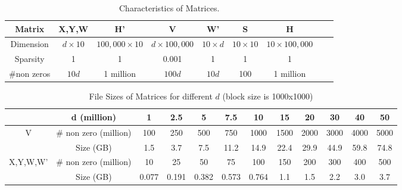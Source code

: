 
\begin{table*}[t]
\centering
\caption{Characteristics of Matrices.}
\label{tab:matrix-stats}
\begin{tabular}{|c|c|c|c|c|c|c|c|c|}
\hline
Matrix & X,Y,W & H' & V & W' & S & H\\
\hline
Dimension & $d\times 10$ &  $100,000\times 10$ & $d\times 100,000$ & $10\times d$ & $10\times 10$ & $10\times 100,000$\\
\hline
Sparsity & 1 & 1& 0.001 & 1 & 1 & 1\\
\hline
\#non zeros & $10d$ & 1 million & $100d$ & $10d$ & 100 & 1 million\\
\hline
\end{tabular}
\SmallCrunch
\end{table*}

\begin{table*}[t]
\centering
\caption{File Sizes of Matrices for different $d$ (block size is 1000x1000)}
\label{tab:file-size}
\begin{tabular}{|c|c|c|c|c|c|c|c|c|c|c|c|}
\hline
& d (million) & 1 & 2.5 & 5 & 7.5 & 10 & 15 & 20 & 30 & 40 & 50\\
\hline
\hline
V & \# non zero (million) & 100 & 250 & 500 & 750 & 1000 & 1500 & 2000 & 3000 & 4000 & 5000\\
\cline{2-12}
& Size (GB)  & 1.5 & 3.7 & 7.5 & 11.2 & 14.9& 22.4& 29.9 & 44.9 &59.8 & 74.8\\
\hline
\hline
X,Y,W,W' & \# non zero (million) & 10 & 25& 50& 75& 100& 150& 200 & 300 &400 & 500\\
\cline{2-12}
& Size (GB) & 0.077 & 0.191 & 0.382& 0.573 & 0.764 & 1.1 & 1.5 & 2.2 & 3.0 & 3.7\\
\hline
\end{tabular}
\SmallCrunch
\end{table*}



